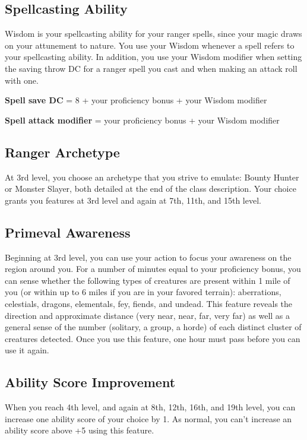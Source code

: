 \subsection{Spellcasting Ability}

Wisdom is your spellcasting ability for your ranger spells, since your magic draws on your attunement to nature. You use your Wisdom whenever a spell refers to your spellcasting ability. In addition, you use your Wisdom modifier when setting the saving throw DC for a ranger spell you cast and when making an attack roll with one.

\textbf{Spell save DC} = 8 + your proficiency bonus + your Wisdom modifier

\textbf{Spell attack modifier} = your proficiency bonus + your Wisdom modifier

\subsection{Ranger Archetype}

At 3rd level, you choose an archetype that you strive to emulate: Bounty Hunter or Monster Slayer, both detailed at the end of the class description. Your choice grants you features at 3rd level and again at 7th, 11th, and 15th level.

\subsection{Primeval Awareness}

Beginning at 3rd level, you can use your action to focus your awareness on the region around you. For a number of minutes equal to your proficiency bonus, you can sense whether the following types of creatures are present within 1 mile of you (or within up to 6 miles if you are in your favored terrain): aberrations, celestials, dragons, elementals, fey, fiends, and undead. This feature reveals the direction and approximate distance (very near, near, far, very far) as well as a general sense of the number (solitary, a group, a horde) of each distinct cluster of creatures detected. Once you use this feature, one hour must pass before you can use it again.

\subsection{Ability Score Improvement}

When you reach 4th level, and again at 8th, 12th, 16th, and 19th level, you can increase one ability score of your choice by 1. As normal, you can't increase an ability score above +5 using this feature.

